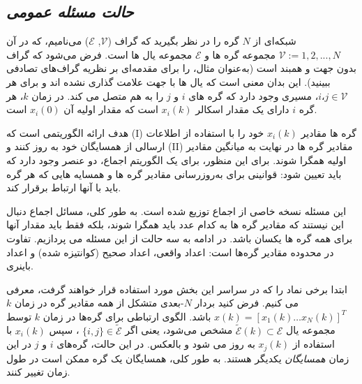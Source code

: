 \documentclass[12pt]{article} %
\begin{document}
	\subsection{\textit{حالت مسئله عمومی}}
	شبکه‌ای از $N$ گره را در نظر بگیرید که گراف ($\mathscr{V}$, $\mathscr{E}$) می‌نامیم، که در آن $\mathscr{V} := {1, 2, . . . , N }$ مجموعه گره ها و $\mathscr{E}$ مجموعه یال ها است. فرض می‌شود که گراف بدون جهت و همبند است (به‌عنوان مثال، \cite{bib17} را برای مقدمه‌ای بر نظریه گراف‌های تصادفی ببینید). این بدان معنی است که یال ها با جهت علامت گذاری نشده اند و برای هر $i، j \in \mathscr{V}$، مسیری وجود دارد که گره های $i$ و $j$ را به هم متصل می کند. در زمان $k$، هر گره $i$ دارای یک مقدار اسکالر $x_i(k)$ است که مقدار اولیه آن $x_i(0)$ است.
	\par
	هدف ارائه الگوریتمی است که (I) گره ها مقادیر $x_i(k)$ خود را با استفاده از اطلاعات ارسالی از همسایگان خود به روز کنند و (II) مقادیر گره ها در نهایت به میانگین مقادیر اولیه همگرا شوند. برای این منظور، برای یک الگوریتم اجماع، دو عنصر وجود دارد که باید تعیین شود: قوانینی برای به‌روزرسانی مقادیر گره ها و همسایه هایی که هر گره باید با آنها ارتباط برقرار کند.
	\par
	این مسئله نسخه خاصی از اجماع توزیع شده است. به طور کلی، مسائل اجماع دنبال این نیستند که مقادیر گره ها به کدام عدد باید همگرا شوند، بلکه فقط باید مقدار آنها برای همه گره ها یکسان باشد. در ادامه به سه حالت از این مسئله می پردازیم. تفاوت در محدوده مقادیر گره‌ها است: اعداد واقعی، اعداد صحیح (کوانتیزه شده) و اعداد باینری.
	\par
	ابتدا برخی نماد را که در سراسر این بخش مورد استفاده قرار خواهند گرفت، معرفی می کنیم. فرض کنید بردار $N$-بعدی متشکل از همه مقادیر گره در زمان 
	$k$ 
	$x(k) = [x_1(k) \hdots x_N(k)]^T$
	 باشد. الگوی ارتباطی برای گره‌ها در زمان
	$k$
	 توسط مجموعه یال
	$\tilde{\mathscr{E}}(k) \subset \mathscr{E}$
	 مشخص می‌شود، یعنی اگر 
	$\{i, j\} \in \tilde{\mathscr{E}}$
	 ، سپس
	$x_i(k)$
	 با استفاده از 
	$x_j(k)$
	 به روز می شود و بالعکس. در این حالت، گره‌های $i$ و $j$ در این زمان \emph{همسایگان} یکدیگر هستند. به طور کلی، همسایگان یک گره ممکن است در طول زمان تغییر کنند.
\end{document}
